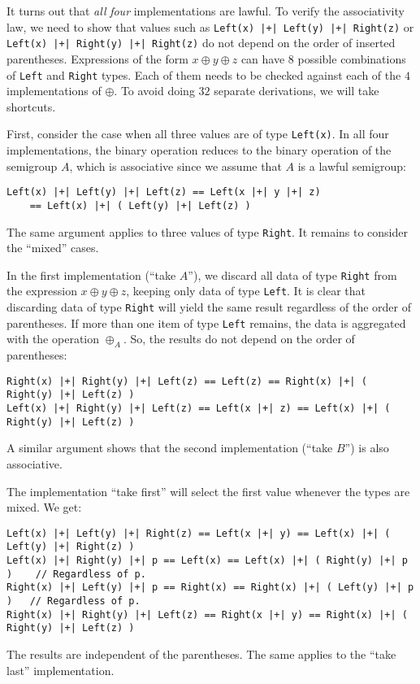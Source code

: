 It turns out that \emph{all} \emph{four} implementations are lawful.
To verify the associativity law, we need to show that values such
as \lstinline!Left(x) |+| Left(y) |+| Right(z)! or \lstinline!Left(x) |+| Right(y) |+| Right(z)!
do not depend on the order of inserted parentheses. Expressions of
the form $x\oplus y\oplus z$ can have $8$ possible combinations
of \lstinline!Left! and \lstinline!Right! types. Each of them needs
to be checked against each of the $4$ implementations of $\oplus$.
To avoid doing $32$ separate derivations, we will take shortcuts.

First, consider the case when all three values are of type \lstinline!Left(x)!.
In all four implementations, the binary operation reduces to the binary
operation of the semigroup $A$, which is associative since we assume
that $A$ is a lawful semigroup:
\begin{lstlisting}
Left(x) |+| Left(y) |+| Left(z) == Left(x |+| y |+| z)
    == Left(x) |+| ( Left(y) |+| Left(z) )
\end{lstlisting}

The same argument applies to three values of type \lstinline!Right!.
It remains to consider the \textsf{``}mixed\textsf{''} cases.

In the first implementation (\textsf{``}take $A$\textsf{''}), we discard all data
of type \lstinline!Right! from the expression $x\oplus y\oplus z$,
keeping only data of type \lstinline!Left!. It is clear that discarding
data of type \lstinline!Right! will yield the same result regardless
of the order of parentheses. If more than one item of type \lstinline!Left!
remains, the data is aggregated with the operation $\oplus_{A}$.
So, the results do not depend on the order of parentheses:
\begin{lstlisting}
Right(x) |+| Right(y) |+| Left(z) == Left(z) == Right(x) |+| ( Right(y) |+| Left(z) )
Left(x) |+| Right(y) |+| Left(z) == Left(x |+| z) == Left(x) |+| ( Right(y) |+| Left(z) )
\end{lstlisting}

A similar argument shows that the second implementation (\textsf{``}take $B$\textsf{''})
is also associative.

The implementation \textsf{``}take first\textsf{''} will select the first value whenever
the types are mixed. We get:
\begin{lstlisting}[mathescape=true]
Left(x) |+| Left(y) |+| Right(z) == Left(x |+| y) == Left(x) |+| ( Left(y) |+| Right(z) )
Left(x) |+| Right(y) |+| p == Left(x) == Left(x) |+| ( Right(y) |+| p )    // Regardless of p.
Right(x) |+| Left(y) |+| p == Right(x) == Right(x) |+| ( Left(y) |+| p )   // Regardless of p.
Right(x) |+| Right(y) |+| Left(z) == Right(x |+| y) == Right(x) |+| ( Right(y) |+| Left(z) )
\end{lstlisting}
The results are independent of the parentheses. The same applies to
the \textsf{``}take last\textsf{''} implementation.

